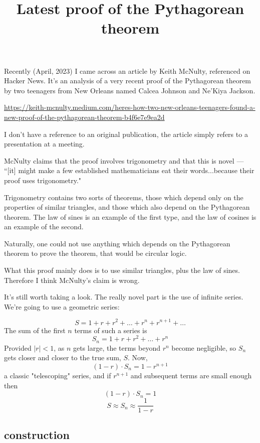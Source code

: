 \documentclass[11pt, oneside]{article}
\title{Latest proof of the Pythagorean theorem}
\date{}
\begin{document}
\maketitle
\Large


Recently (April, 2023) I came across an article by Keith McNulty, referenced on Hacker News.  It's an analysis of a very recent proof of the Pythagorean theorem by two teenagers from New Orleans named Calcea Johnson and Ne'Kiya Jackson.

\url{https://keith-mcnulty.medium.com/heres-how-two-new-orleans-teenagers-found-a-new-proof-of-the-pythagorean-theorem-b4f6e7e9ea2d}

I don't have a reference to an original publication, the article simply refers to a presentation at a meeting.  

McNulty claims that the proof involves trigonometry and that this is novel --- ``[it] might make a few established mathematicians eat their words...because their proof uses trigonometry."

Trigonometry contains two sorts of theorems, those which depend only on the properties of similar triangles, and those which also depend on the Pythagorean theorem.  The law of sines is an example of the first type, and the law of cosines is an example of the second.

Naturally, one could not use anything which depends on the Pythagorean theorem to prove the theorem, that would be circular logic.

What this proof mainly does is to use similar triangles, plus the law of sines.  Therefore I think McNulty's claim is wrong. 

 It's still worth taking a look.  The really novel part is the use of infinite series.  We're going to use a geometric series:
 
\[ S = 1 + r + r^2 + \dots + r^n + r^{n+1} + \dots \]
The sum of the first $n$ terms of such a series is
\[ S_n = 1 + r + r^2 + \dots + r^n \]
Provided $|r| < 1$, as $n$ gets large, the terms beyond $r^n$ become negligible, so $S_n$ gets closer and closer to the true sum, $S$.  Now,
\[ (1 - r) \cdot S_n = 1 - r^{n+1} \]
a classic "telescoping" series, and if $r^{n+1}$ and subsequent terms are small enough then
\[ (1 - r) \cdot S_n = 1 \]
\[ S \approx S_n \approx \frac{1}{1-r} \]

\subsection*{construction}
\end{document}
